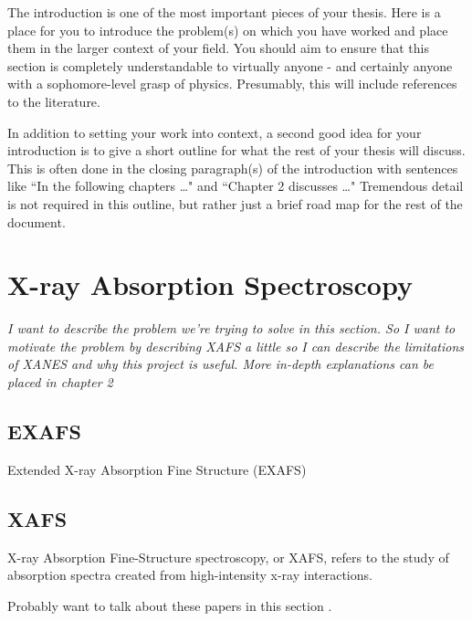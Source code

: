 
The introduction is one of the most important pieces of your thesis.  Here is a place for you to introduce the problem(s) on which you have worked and place them in the larger context of your field.  You should aim to ensure that this section is completely understandable to virtually anyone - and certainly anyone with a sophomore-level grasp of physics.  Presumably, this will include references to the literature.

In addition to setting your work into context, a second good idea for your introduction is to give a short outline for what the rest of your thesis will discuss.  This is often done in the closing paragraph(s) of the introduction with sentences like ``In the following chapters \ldots " and ``Chapter 2 discusses \ldots"  Tremendous detail is not required in this outline, but rather just a brief road map for the rest of the document.

\section{X-ray Absorption Spectroscopy}
\emph{I want to describe the problem we're trying to solve in this section. So I want to motivate the problem by describing XAFS a little so I can describe the limitations of XANES and why this project is useful. More in-depth explanations can be placed in chapter 2}

\subsection{EXAFS}
Extended X-ray Absorption Fine Structure (EXAFS)

\subsection{XAFS}
X-ray Absorption Fine-Structure spectroscopy, or XAFS, refers to the study of absorption spectra created from high-intensity x-ray interactions.

Probably want to talk about these papers in this section \cite{timoshenko2018neural} \cite{Timoshenko2017}.


